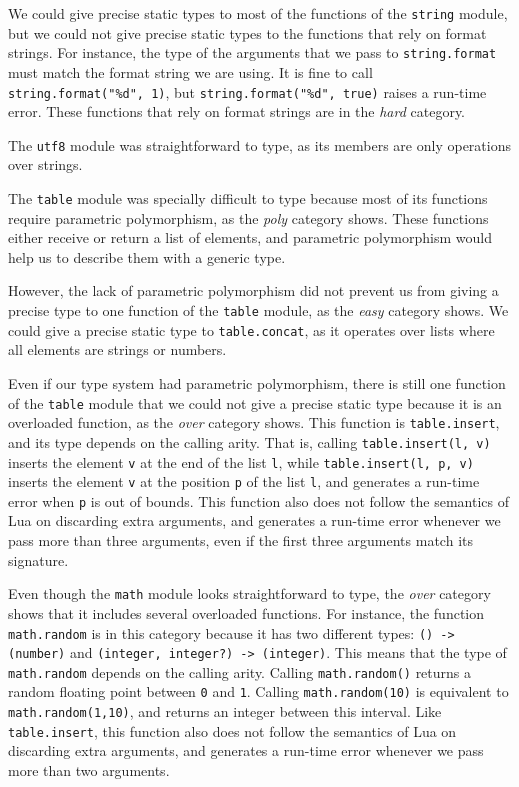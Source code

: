 We could give precise static types to most of the functions of the
\texttt{string} module, but we could not give precise static types
to the functions that rely on format strings.
For instance, the type of the arguments that we pass to
\texttt{string.format} must match the format string we are using.
It is fine to call \texttt{string.format("\%d", 1)}, but
\texttt{string.format("\%d", true)} raises a run-time error.
These functions that rely on format strings are in the \emph{hard} category.

The \texttt{utf8} module was straightforward to type,
as its members are only operations over strings.

The \texttt{table} module was specially difficult to type because
most of its functions require parametric polymorphism,
as the \emph{poly} category shows.
These functions either receive or return a list of elements, and
parametric polymorphism would help us to describe them with a generic type.

However, the lack of parametric polymorphism did not prevent us from
giving a precise type to one function of the \texttt{table} module,
as the \emph{easy} category shows.
We could give a precise static type to \texttt{table.concat},
as it operates over lists where all elements are strings or numbers.

Even if our type system had parametric polymorphism, there is
still one function of the \texttt{table} module that we could
not give a precise static type because it is an overloaded function,
as the \emph{over} category shows.
This function is \texttt{table.insert}, and its type depends on
the calling arity.
That is, calling \texttt{table.insert(l, v)} inserts the
element \texttt{v} at the end of the list \texttt{l},
while \texttt{table.insert(l, p, v)} inserts the element \texttt{v}
at the position \texttt{p} of the list \texttt{l},
and generates a run-time error when \texttt{p} is out of bounds.
This function also does not follow the semantics of Lua on
discarding extra arguments, and generates a run-time error whenever
we pass more than three arguments, even if the first three arguments
match its signature.

Even though the \texttt{math} module looks straightforward to type,
the \emph{over} category shows that it includes several overloaded functions.
For instance, the function \texttt{math.random} is in this category
because it has two different types:
\texttt{() -> (number)} and \texttt{(integer, integer?) -> (integer)}.
This means that the type of \texttt{math.random} depends on the calling arity.
Calling \texttt{math.random()} returns a random floating point
between \texttt{0} and \texttt{1}.
Calling \texttt{math.random(10)} is equivalent to \texttt{math.random(1,10)},
and returns an integer between this interval.
Like \texttt{table.insert}, this function also does not follow the
semantics of Lua on discarding extra arguments,
and generates a run-time error whenever we pass more than two arguments.

